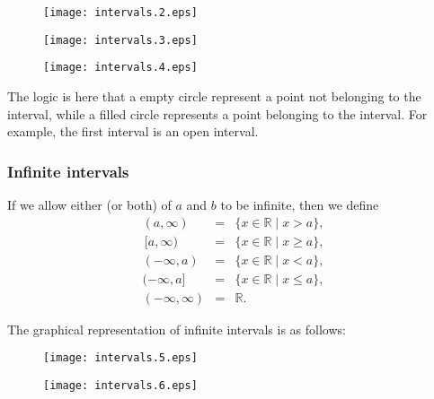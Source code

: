 \documentclass[12pt]{article}
\newcommand{\sR}[0]{\mathbb{R}}
\begin{document}
\begin{figure}[!htb]
\begin{center}
\texttt{[image: intervals.2.eps]}
\end{center}
\end{figure}

\begin{figure}[!htb]
\begin{center}
\texttt{[image: intervals.3.eps]}
\end{center}
\end{figure}

\begin{figure}[!htb]
\begin{center}
\texttt{[image: intervals.4.eps]}
\end{center}
\end{figure}

The logic is here that a empty circle represent a point not belonging 
to the interval, while a filled circle represents a point belonging
to the interval. For example, the first interval is an open interval.

\subsubsection*{Infinite intervals}
If we allow either (or both) of $a$ and $b$ to be infinite, then we
define
\begin{eqnarray*}
(a,\infty) &=& \{ x\in \sR \mid x> a\}, \\
\,\![a,\infty) &=& \{ x\in \sR \mid x\ge  a\}, \\
(-\infty, a) &=& \{ x\in \sR \mid x< a\}, \\
(-\infty, a] &=& \{ x\in \sR \mid x\le  a\}, \\
(-\infty, \infty) &=& \sR.
\end{eqnarray*}

The graphical representation of infinite intervals is as follows:

\begin{figure}[!htb]
\begin{center}
\texttt{[image: intervals.5.eps]}
\end{center}
\end{figure}


\begin{figure}[!htb]
\begin{center}
\texttt{[image: intervals.6.eps]}
\end{center}
\end{figure}
\end{document}
